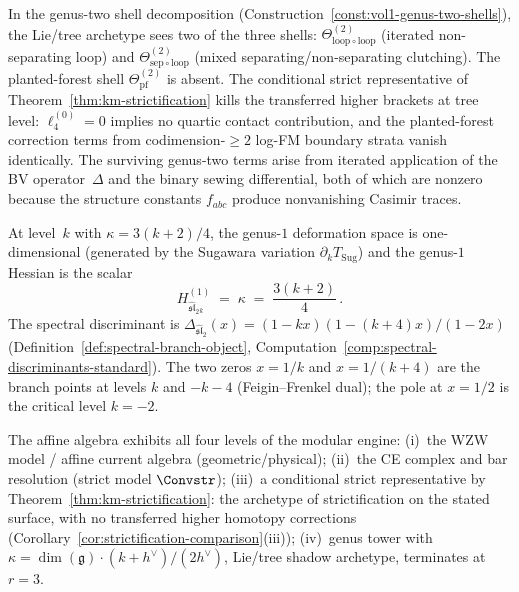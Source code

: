 \begin{remark}
\label{rem:km-genus-two-shells}
In the genus-two shell decomposition
(Construction~\ref{const:vol1-genus-two-shells}),
the Lie/tree archetype sees two of the three shells:
$\Theta^{(2)}_{\mathrm{loop} \circ \mathrm{loop}}$ (iterated
non-separating loop) and
$\Theta^{(2)}_{\mathrm{sep} \circ \mathrm{loop}}$ (mixed
separating/non-separating clutching). The planted-forest
shell $\Theta^{(2)}_{\mathrm{pf}}$ is absent. The conditional
strict representative of Theorem~\ref{thm:km-strictification} kills
the transferred higher brackets at tree level: $\ell_4^{(0)} = 0$
implies no quartic contact contribution, and the planted-forest
correction terms from codimension-${\geq}2$ log-FM boundary strata
vanish identically. The surviving genus-two terms arise from
iterated application of the BV operator~$\Delta$ and the
binary sewing differential, both of which are nonzero because
the structure constants $f_{abc}$ produce nonvanishing Casimir
traces.
\end{remark}

\begin{computation}
\label{comp:km-genus1-hessian}
At level~$k$ with $\kappa=3(k+2)/4$, the genus-$1$ deformation
space is one-dimensional (generated by the Sugawara variation
$\partial_k T_{\mathrm{Sug}}$) and the genus-$1$ Hessian is
the scalar
\begin{equation}\label{eq:sl2-kappa}
H^{(1)}_{\widehat{\mathfrak{sl}}_2{}_k}
\;=\;
\kappa
\;=\;
\frac{3(k+2)}{4}\,.
\end{equation}
The spectral discriminant is
$\Delta_{\widehat{\mathfrak{sl}}_2}(x)
= (1-kx)(1-(k+4)x)/(1-2x)$
(Definition~\ref{def:spectral-branch-object},
Computation~\ref{comp:spectral-discriminants-standard}).
The two zeros $x=1/k$ and $x=1/(k+4)$ are the branch points
at levels $k$ and $-k-4$ (Feigin--Frenkel dual); the pole
at $x=1/2$ is the critical level $k=-2$.
\end{computation}

\begin{remark}
\label{rem:km-four-level}
The affine algebra exhibits all four levels of the modular engine:
(i)~the WZW model / affine current algebra (geometric/physical);
(ii)~the CE complex and bar resolution (strict model $\Convstr$);
(iii)~a conditional strict representative by
Theorem~\ref{thm:km-strictification}: the archetype of
strictification on the stated surface, with no transferred higher
homotopy corrections
(Corollary~\ref{cor:strictification-comparison}(iii));
(iv)~genus tower with $\kappa = \dim(\mathfrak{g})\cdot(k + h^\vee)/(2h^\vee)$, Lie/tree shadow
archetype, terminates at $r = 3$.
\end{remark}

